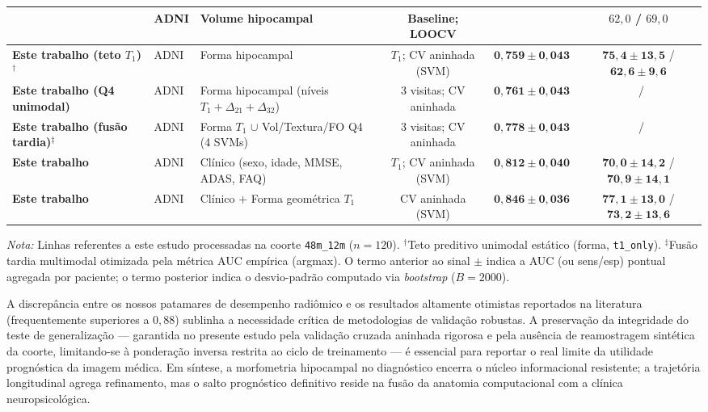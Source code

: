 \documentclass[review]{elsarticle}
\newcommand{\code}[1]{\texttt{#1}}
\begin{document}
\begin{table}
\begin{tabular}{@{}lllccc@{}}
			\citet{cuingnet-2011} & ADNI &
			Volume hipocampal &
			Baseline; LOOCV &
			\textemdash & $62{,}0$ / $69{,}0$ \\
			\midrule
			\textbf{Este trabalho (teto $T_1$)}$^{\dagger}$ & ADNI &
			Forma hipocampal &
			$T_1$; CV aninhada (SVM) &
			$\mathbf{0{,}759 \pm 0{,}043}$ & $\mathbf{75{,}4 \pm 13{,}5}$ / $\mathbf{62{,}6 \pm 9{,}6}$ \\
			\textbf{Este trabalho (Q4 unimodal)} & ADNI &
			Forma hipocampal (níveis $T_1+\Delta_{21}+\Delta_{32}$) &
			3 visitas; CV aninhada &
			$\mathbf{0{,}761 \pm 0{,}043}$ & \textemdash\ / \textemdash \\
			\textbf{Este trabalho (fusão tardia)}$^{\ddagger}$ & ADNI &
			Forma $T_1$ $\cup$ Vol/Textura/FO Q4 (4 SVMs) &
			3 visitas; CV aninhada &
			$\mathbf{0{,}778 \pm 0{,}043}$ & \textemdash\ / \textemdash \\
			\textbf{Este trabalho} & ADNI &
			Clínico (sexo, idade, MMSE, ADAS, FAQ) &
			$T_1$; CV aninhada (SVM) &
			$\mathbf{0{,}812 \pm 0{,}040}$ & $\mathbf{70{,}0 \pm 14{,}2}$ / $\mathbf{70{,}9 \pm 14{,}1}$ \\
			\textbf{Este trabalho} & ADNI &
			Clínico $+$ Forma geométrica $T_1$ &
			CV aninhada (SVM) &
			$\mathbf{0{,}846 \pm 0{,}036}$ & $\mathbf{77{,}1 \pm 13{,}0}$ / $\mathbf{73{,}2 \pm 13{,}6}$ \\
			\bottomrule
		\end{tabular}
		\vspace{0.5em}
		\begin{flushleft}
			\scriptsize
			\textit{Nota:} Linhas referentes a este estudo processadas na coorte \code{48m\_12m} ($n=120$).
			$^{\dagger}$Teto preditivo unimodal estático (forma, \code{t1\_only}).
			$^{\ddagger}$Fusão tardia multimodal otimizada pela métrica AUC empírica (argmax).
			O termo anterior ao sinal $\pm$ indica a AUC (ou sens/esp) pontual agregada por paciente; o termo posterior indica o desvio-padrão computado via \emph{bootstrap} ($B=2000$).
		\end{flushleft}
	\end{table}
	
	A discrepância entre os nossos patamares de desempenho radiômico e os resultados altamente otimistas reportados na literatura (frequentemente superiores a $0{,}88$) sublinha a necessidade crítica de metodologias de validação robustas. A preservação da integridade do teste de generalização --- garantida no presente estudo pela validação cruzada aninhada rigorosa e pela ausência de reamostragem sintética da coorte, limitando-se à ponderação inversa restrita ao ciclo de treinamento --- é essencial para reportar o real limite da utilidade prognóstica da imagem médica. Em síntese, a morfometria hipocampal no diagnóstico encerra o núcleo informacional resistente; a trajetória longitudinal agrega refinamento, mas o salto prognóstico definitivo reside na fusão da anatomia computacional com a clínica neuropsicológica.
	
\end{document}
